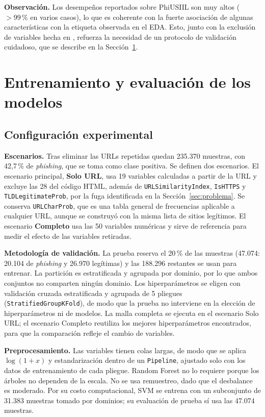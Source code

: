 \documentclass[journal]{IEEEtran}
\begin{document}
\textbf{Observación.} Los desempeños reportados sobre PhiUSIIL son muy altos ($>99\,\%$ en varios
casos), lo que es coherente con la fuerte asociación de algunas características con la etiqueta
observada en el EDA. Esto, junto con la exclusión de variables hecha en \cite{yulianti2026},
refuerza la necesidad de un protocolo de validación cuidadoso, que se describe en la
Sección~\ref{sec:modelos}.

\section{Entrenamiento y evaluación de los modelos}
\label{sec:modelos}
\subsection{Configuración experimental}

\textbf{Escenarios.} Tras eliminar las URLs repetidas quedan 235.370 muestras, con 42,7\,\% de
\textit{phishing}, que se toma como clase positiva. Se definen dos escenarios. El escenario
principal, \textbf{Solo URL}, usa 19 variables calculadas a partir de la URL y excluye las 28 del
código HTML, además de \texttt{URLSimilarityIndex}, \texttt{IsHTTPS} y \texttt{TLDLegitimateProb},
por la fuga identificada en la Sección~\ref{sec:problema}. Se conserva \texttt{URLCharProb}, que es
una tabla general de frecuencias aplicable a cualquier URL, aunque se construyó con la misma lista
de sitios legítimos. El escenario \textbf{Completo} usa las 50 variables numéricas y sirve de
referencia para medir el efecto de las variables retiradas.

\textbf{Metodología de validación.} La prueba reserva el 20\,\% de las muestras (47.074: 20.104 de
\textit{phishing} y 26.970 legítimas) y las 188.296 restantes se usan para entrenar. La partición es
estratificada y agrupada por dominio, por lo que ambos conjuntos no comparten ningún dominio. Los
hiperparámetros se eligen con validación cruzada estratificada y agrupada de 5 pliegues
(\texttt{StratifiedGroupKFold}), de modo que la prueba no interviene en la elección de
hiperparámetros ni de modelos. La malla completa se ejecuta en el escenario Solo URL; el escenario Completo reutiliza
los mejores hiperparámetros encontrados, para que la comparación refleje el cambio de variables.

\textbf{Preprocesamiento.} Las variables tienen colas largas, de modo que se aplica $\log(1+x)$ y
estandarización dentro de un \texttt{Pipeline}, ajustado solo con los datos de entrenamiento de
cada pliegue. Random Forest no lo requiere porque los árboles no dependen de la escala. No se usa
remuestreo, dado que el desbalance es moderado. Por su costo computacional, SVM se entrena con un
subconjunto de 31.383 muestras tomado por dominios; su evaluación de prueba sí usa las 47.074
muestras.
\end{document}
